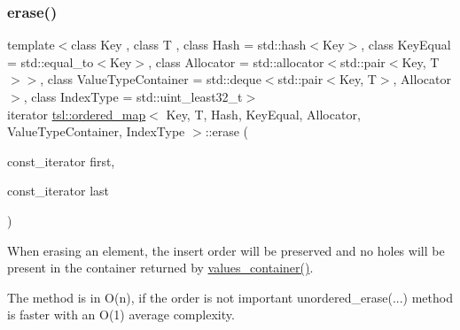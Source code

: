 \subsubsection{\texorpdfstring{erase()}{erase()}\hspace{0.1cm}{\footnotesize\ttfamily [3/7]}}
{\footnotesize\ttfamily template$<$class Key , class T , class Hash  = std\+::hash$<$\+Key$>$, class Key\+Equal  = std\+::equal\+\_\+to$<$\+Key$>$, class Allocator  = std\+::allocator$<$std\+::pair$<$\+Key, T$>$$>$, class Value\+Type\+Container  = std\+::deque$<$std\+::pair$<$\+Key, T$>$, Allocator$>$, class Index\+Type  = std\+::uint\+\_\+least32\+\_\+t$>$ \\
iterator \mbox{\hyperlink{classtsl_1_1ordered__map}{tsl\+::ordered\+\_\+map}}$<$ Key, T, Hash, Key\+Equal, Allocator, Value\+Type\+Container, Index\+Type $>$\+::erase (\begin{DoxyParamCaption}\item[{const\+\_\+iterator}]{first,  }\item[{const\+\_\+iterator}]{last }\end{DoxyParamCaption})\hspace{0.3cm}{\ttfamily [inline]}}





When erasing an element, the insert order will be preserved and no holes will be present in the container returned by \textquotesingle{}\mbox{\hyperlink{classtsl_1_1ordered__map_abb69bca0a80def48ae806078d77175cb}{values\+\_\+container()}}\textquotesingle{}.

The method is in O(n), if the order is not important \textquotesingle{}unordered\+\_\+erase(...)\textquotesingle{} method is faster with an O(1) average complexity. \mbox{\label{classtsl_1_1ordered__map_a6bf7811b4bfc892388dfc2b5b0c0c8b9}} 
